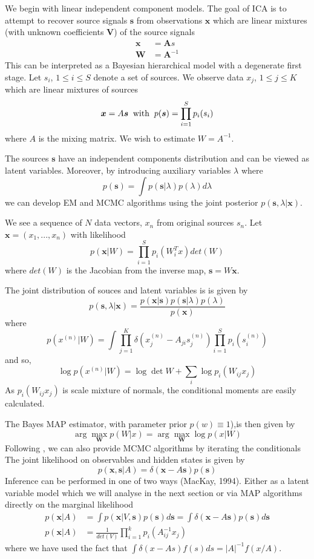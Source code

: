 \documentclass[11pt]{article}%
\begin{document}
We begin with linear independent component models. 
The goal of ICA is to  attempt to recover source signals $\bm s$ from observations $\bm x$ which are linear mixtures (with unknown coefficients $\bm V$) of the source signals
\begin{align*}
\bm x &= \bm As\\
\bm W &= \bm A^{-1}
\end{align*}
This can be interpreted as a Bayesian hierarchical model with a degenerate first stage. 
Let $s_i$, $1\leq i \leq S$ denote a set of sources. We observe data $x_j$, $1\leq j\leq K$ which are linear mixtures of sources 
$$ \bm x = A \bm s  \; \; {\rm with} \; \;  p(\bm s) = \prod_{i=1}^S p_i(s_i) $$
where $A$ is the mixing matrix. We wish to estimate $W=A^{-1}$. 

The sources $ \bm s $ have an independent components distribution and can be viewed as latent variables. Moreover, by introducing auxiliary variables $\lambda$ where 
$$p(\bm s) = \int p(\bm s|\lambda)p(\lambda) d\lambda $$ we can develop EM and MCMC algorithms using the joint posterior $ p( \bm s , \lambda | \bm x ) $.

We see a sequence of $N$ data vectors, $x_n$ from original sources $s_n$. Let $\bm{x} = (x_1, ..., x_n)$  with likelihood 
$$
p(\bm{x} | W) = \prod_{i=1}^{S} p_i(W_i^Tx) det(W)
$$  
where $det(W)$ is the Jacobian from the inverse map, $\bm s = W \bm x$. 

The joint  distribution  of souces and latent variables is is given by 
$$
p(\bm s,\lambda | \bm  x) = \frac{p(\bm x| \bm s) p(\bm s|\lambda)p(\lambda)}{p(\bm x)}
$$
where 
$$
p(x^{(n)} | W) = \int \prod_{j=1}^K \delta(x^{(n)}_j - A_{ji}s^{(n)}_j) \prod_{i=1}^S p_i(s^{(n)}_i)
$$
and so, 
$$
\log p( x^{(n)} | W) = \log\det W + \sum_i \log p_i(W_{ij} x_j)
$$
As $p_i(W_{ij}x_j)$ is scale mixture of normals, the conditional moments are easily calculated. 

The Bayes MAP estimator, with parameter prior $p(w) \equiv 1$),is then given by 
$$
\arg\max_{\bm W} p(W|x) = \arg\max_{\bm{W}} \log p(x|W) 
$$
Following \citet{fevotte2004bayesian}, we can also provide MCMC algorithms by iterating the conditionals \\



The joint likelihood on observables and hidden states is given by
$$
p(  \bm x , \bm s | A )  = \delta( \bm x - A \bm s ) p(\bm s) 
$$
Inference can be performed in one of two ways  (MacKay, 1994). Either as a latent variable model which we will analyse in the next section or
via MAP algorithms directly on the marginal likelihood
\begin{align*}
p( \bm x | A )   &= \int p(\bm x|V,\bm s)p(\bm s) d \bm s  =  \int \delta( \bm x - A \bm s ) p(\bm s) d \bm s \\
p( \bm x | A )  & = \frac{1}{ det(V) } \prod_{i=1}^k  p_i (  A_{ij}^{-1} x_j) 
\end{align*}
where we have used the fact that $ \int \delta(x - As ) f(s) ds = |A|^{-1} f(x/A) $. 
\end{document}
